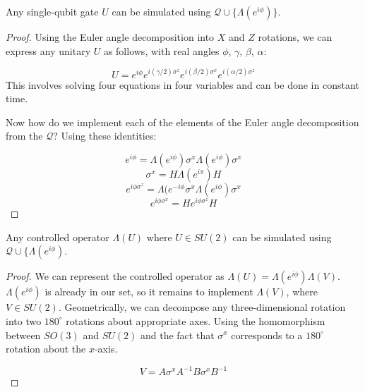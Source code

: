 \begin{theorem}[Problem 8.1]
Any single-qubit gate $U$ can be simulated using $\mathcal{Q} \cup \{ \Lambda(e^{i\phi}) \}$.
\end{theorem}

\begin{proof}
Using the Euler angle decomposition into $X$ and $Z$ rotations, we can express any
unitary $U$ as follows, with real angles $\phi$, $\gamma$, $\beta$, $\alpha$:

\begin{equation}
U = e^{i\phi}e^{i(\gamma/2)\sigma^z}e^{i(\beta/2)\sigma^x}e^{i(\alpha/2)\sigma^z}
\end{equation}
This involves solving four equations in four variables and can be done in constant time.

Now how do we implement each of the elements of the Euler angle decomposition from
the $\mathcal{Q}$? Using these identities:

\begin{equation}
e^{i\phi} = \Lambda(e^{i\phi})\sigma^x\Lambda(e^{i\phi})\sigma^x
\end{equation}
\begin{equation}
\sigma^x = H\Lambda(e^{i\pi})H
\end{equation}
\begin{equation}
e^{i\phi\sigma^z} = \Lambda(e^{-i\phi}\sigma^x\Lambda(e^{i\phi})\sigma^x
\end{equation}
\begin{equation}
e^{i\phi\sigma^x} = H e^{i\phi\sigma^z} H
\end{equation}
\end{proof}

\begin{theorem}[Problem 8.2]
Any controlled operator $\Lambda(U)$ where $U \in SU(2)$ can be simulated using
$\mathcal{Q} \cup \{ \Lambda(e^{i\phi})$.
\end{theorem}

\begin{proof}
We can represent the controlled operator as $\Lambda(U) = \Lambda(e^{i\phi})\Lambda(V)$.
$\Lambda(e^{i\phi})$ is already in our set, so it remains to implement
$\Lambda(V)$, where $V \in SU(2)$. Geometrically, we can decompose any
three-dimensional rotation into two $180^{\circ}$ rotations about appropriate
axes. Using the homomorphism between $SO(3)$ and $SU(2)$ and the fact that
$\sigma^x$ corresponds to a $180^{\circ}$ rotation about the $x$-axis.

\begin{equation}
V = A\sigma^x A^{-1} B\sigma^x B^{-1}
\end{equation}
\end{proof}
